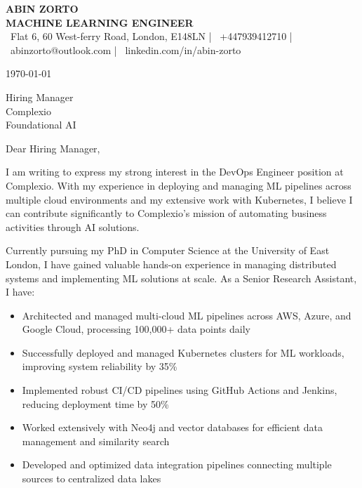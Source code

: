 \documentclass[10pt,a4paper]{article}
\begin{document}

\begin{center}
    {\color{primary}\Large\textbf{ABIN ZORTO}}\\[0.2em]
    {\color{secondary}\large\textbf{MACHINE LEARNING ENGINEER}}\\[0.3em]
    
    \small\color{secondary}
    \faMapMarker\ Flat 6, 60 West-ferry Road, London, E148LN |
    \faMobile\ +447939412710 |
    \faEnvelope\ abinzorto@outlook.com |
    \faLinkedin\ linkedin.com/in/abin-zorto
\end{center}

\vspace{1em}
\today

\vspace{1em}
Hiring Manager\\
Complexio\\
Foundational AI

\vspace{1em}
Dear Hiring Manager,

I am writing to express my strong interest in the DevOps Engineer position at Complexio. With my experience in deploying and managing ML pipelines across multiple cloud environments and my extensive work with Kubernetes, I believe I can contribute significantly to Complexio's mission of automating business activities through AI solutions.

Currently pursuing my PhD in Computer Science at the University of East London, I have gained valuable hands-on experience in managing distributed systems and implementing ML solutions at scale. As a Senior Research Assistant, I have:

\begin{itemize}
    \item Architected and managed multi-cloud ML pipelines across AWS, Azure, and Google Cloud, processing 100,000+ data points daily
    \item Successfully deployed and managed Kubernetes clusters for ML workloads, improving system reliability by 35\%
    \item Implemented robust CI/CD pipelines using GitHub Actions and Jenkins, reducing deployment time by 50\%
    \item Worked extensively with Neo4j and vector databases for efficient data management and similarity search
    \item Developed and optimized data integration pipelines connecting multiple sources to centralized data lakes
\end{itemize}
\end{document}
